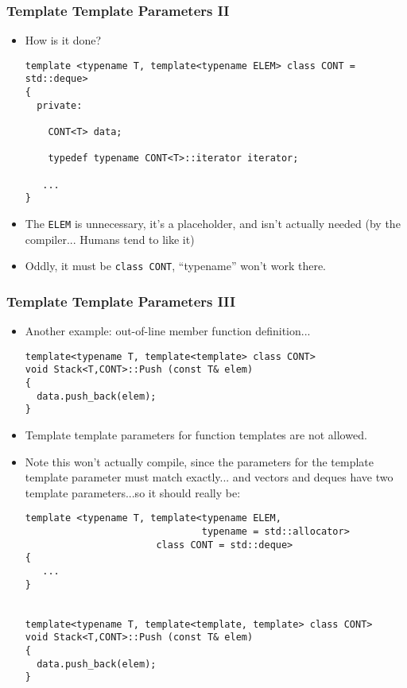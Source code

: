 \begin{frame}[fragile,t]
\frametitle{Template Template Parameters II}
\begin{itemize}[<+->]
\item How is it done?
{\scriptsize
\begin{verbatim}
template <typename T, template<typename ELEM> class CONT = std::deque>
{
  private: 

    CONT<T> data;
  
    typedef typename CONT<T>::iterator iterator;

   ...
}
\end{verbatim}
}
\item The \texttt{ELEM} is unnecessary, it's a placeholder, and isn't
  actually needed (by the compiler... Humans tend to like it)
\item Oddly, it must be \texttt{class CONT}, ``typename'' won't work there.


\end{itemize}
\end{frame}
\begin{frame}[fragile,t]
\frametitle{Template Template Parameters III}
\begin{itemize}[<+->]
\item Another example: out-of-line member function definition...


{\scriptsize
\begin{verbatim}
template<typename T, template<template> class CONT>
void Stack<T,CONT>::Push (const T& elem)
{
  data.push_back(elem);
}
\end{verbatim}
}
\item Template template parameters for function templates are not
  allowed.
\item Note this won't actually compile, since the parameters for the
  template template parameter must match exactly... and vectors and
  deques have two template parameters...so it should really be:
{\scriptsize
\begin{verbatim}
template <typename T, template<typename ELEM, 
                               typename = std::allocator> 
                       class CONT = std::deque>
{
   ...
}


template<typename T, template<template, template> class CONT>
void Stack<T,CONT>::Push (const T& elem)
{
  data.push_back(elem);
}
\end{verbatim}
}

\end{itemize}


\end{frame}




